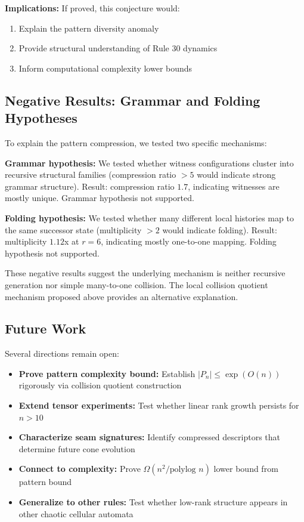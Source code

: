\documentclass[11pt]{article}
\begin{document}
\textbf{Implications:} If proved, this conjecture would:
\begin{enumerate}
    \item Explain the pattern diversity anomaly
    \item Provide structural understanding of Rule 30 dynamics
    \item Inform computational complexity lower bounds
\end{enumerate}

\subsection{Negative Results: Grammar and Folding Hypotheses}

To explain the pattern compression, we tested two specific mechanisms:

\textbf{Grammar hypothesis:} We tested whether witness configurations cluster into recursive structural families (compression ratio $> 5$ would indicate strong grammar structure). Result: compression ratio $1.7$, indicating witnesses are mostly unique. Grammar hypothesis not supported.

\textbf{Folding hypothesis:} We tested whether many different local histories map to the same successor state (multiplicity $> 2$ would indicate folding). Result: multiplicity $1.12$x at $r=6$, indicating mostly one-to-one mapping. Folding hypothesis not supported.

These negative results suggest the underlying mechanism is neither recursive generation nor simple many-to-one collision. The local collision quotient mechanism proposed above provides an alternative explanation.

\subsection{Future Work}

Several directions remain open:

\begin{itemize}
    \item \textbf{Prove pattern complexity bound:} Establish $|P_n| \leq \exp(O(n))$ rigorously via collision quotient construction
    \item \textbf{Extend tensor experiments:} Test whether linear rank growth persists for $n > 10$
    \item \textbf{Characterize seam signatures:} Identify compressed descriptors that determine future cone evolution
    \item \textbf{Connect to complexity:} Prove $\Omega(n^2/\text{polylog } n)$ lower bound from pattern bound
    \item \textbf{Generalize to other rules:} Test whether low-rank structure appears in other chaotic cellular automata
\end{itemize}
\end{document}
